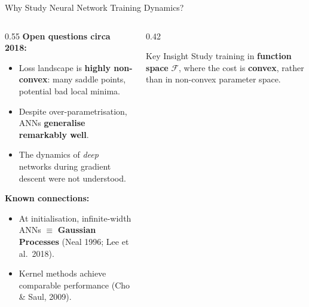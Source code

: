 \documentclass[aspectratio=169, 10pt]{beamer}
\newcommand{\highlight}[1]{\textcolor{blue!70!black}{\textbf{#1}}}
\begin{document}
\begin{frame}{Why Study Neural Network Training Dynamics?}
  \begin{columns}[T]
    \begin{column}{0.55\textwidth}
      \textbf{Open questions circa 2018:}
      \begin{itemize}
        \item Loss landscape is \highlight{highly non-convex}: many saddle points, potential bad local minima.
        \item Despite over-parametrisation, ANNs \highlight{generalise remarkably well}.
        \item The dynamics of \emph{deep} networks during gradient descent were not understood.
      \end{itemize}
      \vspace{0.4em}
      \textbf{Known connections:}
      \begin{itemize}
        \item At initialisation, infinite-width ANNs $\equiv$ \textbf{Gaussian Processes} (Neal 1996; Lee et al.\ 2018).
        \item Kernel methods achieve comparable performance (Cho \& Saul, 2009).
      \end{itemize}
    \end{column}
    \begin{column}{0.42\textwidth}
      \vspace{0.3em}

      \begin{block}{\small Key Insight}
        Study training in \textbf{function space} $\mathcal{F}$, where the cost is \textbf{convex}, rather than in non-convex parameter space.
      \end{block}
    \end{column}
  \end{columns}
\end{frame}
\end{document}
